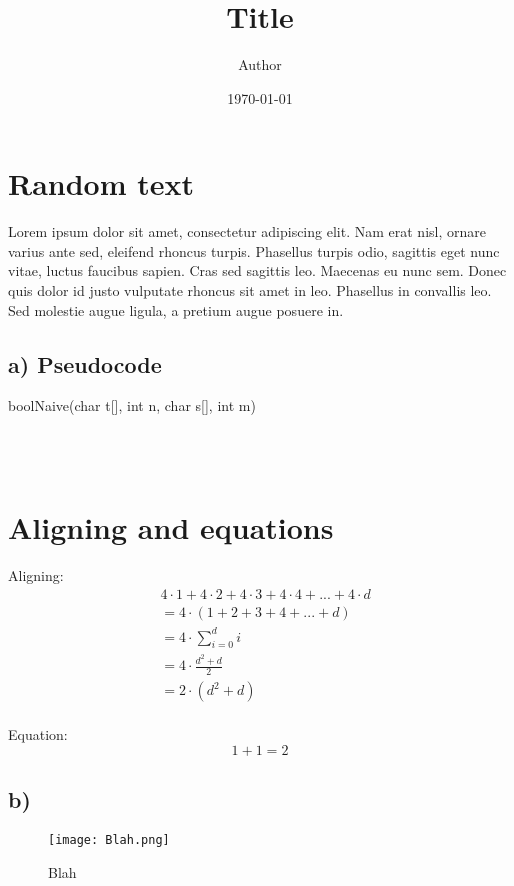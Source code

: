 \documentclass[12pt,a4paper,twoside]{article}
\begin{document}
\title{Title}
\author{Author}
\date{\today}
\maketitle


\section*{Random text}
Lorem ipsum dolor sit amet, consectetur adipiscing elit. Nam erat nisl, ornare varius ante sed, eleifend rhoncus turpis. Phasellus turpis odio, sagittis eget nunc vitae, luctus faucibus sapien. Cras sed sagittis leo. Maecenas eu nunc sem. Donec quis dolor id justo vulputate rhoncus sit amet in leo. Phasellus in convallis leo. Sed molestie augue ligula, a pretium augue posuere in.
\subsection*{a) Pseudocode}
\begin{algorithm}[H]
\NoCaptionOfAlgo
 \caption{\hskip0.3cm boolNaive(char t[], int n, char s[], int m)}
\end{algorithm}
\\ \\ 

\section*{Aligning and equations}
Aligning:\\
\begin{align*}
&4 \cdot 1 + 4 \cdot 2 + 4 \cdot 3 + 4 \cdot 4 + ... + 4 \cdot d \\
&= 4 \cdot (1 + 2 + 3 + 4 + ... + d) \\
&= 4 \cdot \sum_{i=0}^d i \\
&= 4 \cdot \frac{d^2+d}{2} \\
&= 2 \cdot (d^2 + d) \\
\end{align*}


Equation:\\
\begin{equation*}
1 + 1 = 2
\end{equation*}

\subsection*{b)}
\begin{figure}[h]
\begin{center}
\texttt{[image: Blah.png]}
\caption{Blah}
\label{Blah}
\end{center}
\end{figure}
\end{document}
